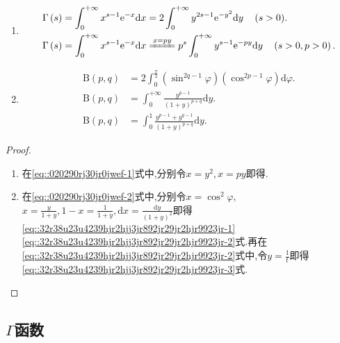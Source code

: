 \documentclass[../../main.tex]{subfiles}%
\begin{document}
\begin{theorem}\label{theorem:Euler积分的其他形式}
\begin{enumerate}[(1)]
\item \begin{align*}
\Gamma \left( s \right) &=\int_0^{+\infty}{x^{s-1}\mathrm{e}^{-x}\mathrm{d}x=2\int_0^{+\infty}{y^{2s-1}\mathrm{e}^{-y^2}\mathrm{d}y\quad \left( s>0 \right) }}.
\\
\Gamma \left( s \right) &=\int_0^{+\infty}{x^{s-1}\mathrm{e}^{-x}\mathrm{d}x}\xlongequal{x=py}p^s\int_0^{+\infty}{y^{s-1}\mathrm{e}^{-py}\mathrm{d}y}\quad \left( s>0,p>0 \right) .
\end{align*}

\item \begin{align}
\mathrm{B}\left( p,q \right) &=2\int_0^{\frac{\pi}{2}}{\left( \sin ^{2q-1}\varphi \right) \left( \cos ^{2p-1}\varphi \right) \mathrm{d}\varphi }.\label{eq::32r38u23u4239hjr2hjj3jr892jr29jr2hjr9923jr-1}
\\
\mathrm{B}\left( p,q \right) &=\int_0^{+\infty}{\frac{y^{p-1}}{\left( 1+y \right) ^{p+q}}\mathrm{d}y}.\label{eq::32r38u23u4239hjr2hjj3jr892jr29jr2hjr9923jr-2}
\\
\mathrm{B}\left( p,q \right) &=\int_0^1{\frac{y^{p-1}+y^{q-1}}{\left( 1+y \right) ^{p+q}}\mathrm{d}y}.\label{eq::32r38u23u4239hjr2hjj3jr892jr29jr2hjr9923jr-3}
\end{align}
\end{enumerate}
\end{theorem}
\begin{proof}
\begin{enumerate}[(1)]
\item 在\eqref{eq::020290rj30jr0jwef-1}式中,分别令$x=y^2$,$\,x=py$即得.

\item 在\eqref{eq::020290rj30jr0jwef-2}式中,分别令$x=\cos^2\varphi$,$x=\frac{y}{1+y},1-x=\frac{1}{1+y},\mathrm{d}x = \frac{\mathrm{d}y}{(1+y)^2}$即得\eqref{eq::32r38u23u4239hjr2hjj3jr892jr29jr2hjr9923jr-1}\eqref{eq::32r38u23u4239hjr2hjj3jr892jr29jr2hjr9923jr-2}式.再在\eqref{eq::32r38u23u4239hjr2hjj3jr892jr29jr2hjr9923jr-2}式中,令$y=\frac{1}{t}$即得\eqref{eq::32r38u23u4239hjr2hjj3jr892jr29jr2hjr9923jr-3}式.
\end{enumerate}
\end{proof}


\subsection{$\Gamma$函数}
\end{document}
